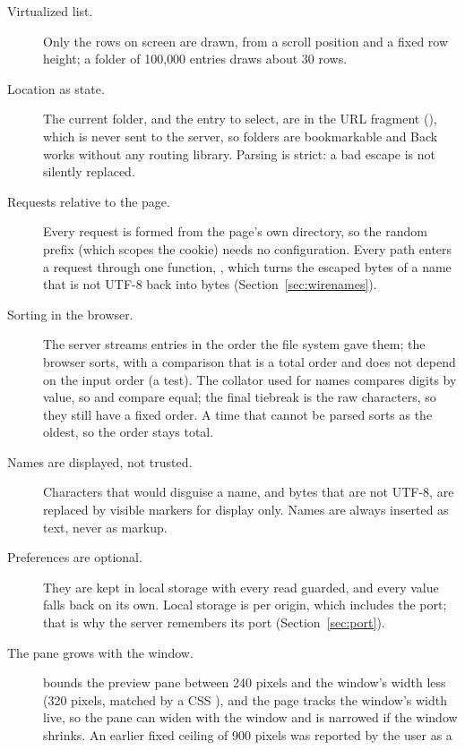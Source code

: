 \begin{description}
  \item[Virtualized list.]  Only the rows on screen are drawn, from a scroll position and a
        fixed row height; a folder of 100{,}000 entries draws about 30 rows.
  \item[Location as state.]  The current folder, and the entry to select, are in the URL
        fragment (), which is never sent to the server, so folders
        are bookmarkable and Back works without any routing library.  Parsing is strict: a
        bad escape is not silently replaced.
  \item[Requests relative to the page.]  Every request is formed from the page's own
        directory, so the random prefix (which scopes the cookie) needs no configuration.
        Every path enters a request through one function, , which turns
        the escaped bytes of a name that is not UTF-8 back into bytes
        (Section~\ref{sec:wirenames}).
  \item[Sorting in the browser.]  The server streams entries in the order the file system
        gave them; the browser sorts, with a comparison that is a total order and does not
        depend on the input order (a test).  The collator used for names compares digits by
        value, so  and  compare equal; the final tiebreak is the
        raw characters, so they still have a fixed order.  A time that cannot be parsed sorts as the oldest,
        so the order stays total.
  \item[Names are displayed, not trusted.]  Characters that would disguise a name, and
        bytes that are not UTF-8, are replaced by visible markers for display only.  Names are always inserted as text, never as markup.
  \item[Preferences are optional.]  They are kept in local storage with every read guarded, and
        every value falls back on its own.  Local storage is per origin, which includes the
        port; that is why the server remembers its port (Section~\ref{sec:port}).
  \item[The pane grows with the window.]   bounds the preview pane
        between 240 pixels and the window's width less 
        (320 pixels, matched by a CSS ), and the page tracks the window's
        width live, so the pane can widen with the window and is narrowed if the window
        shrinks.  An earlier fixed ceiling of 900 pixels was reported by the user as a

\end{description}
